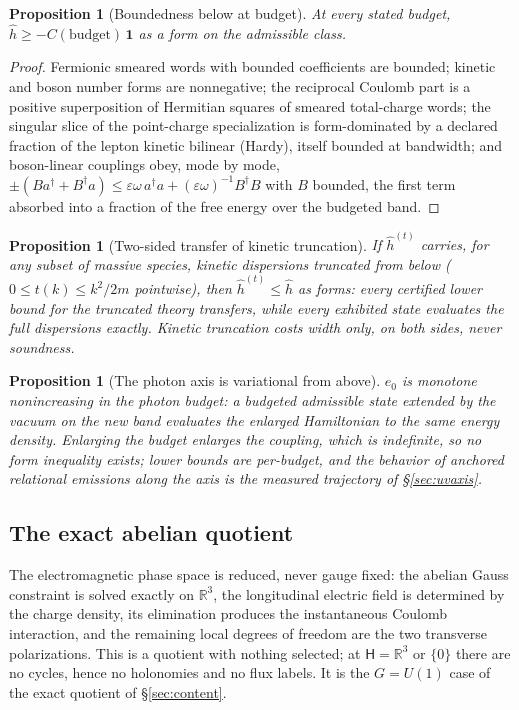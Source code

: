 \documentclass[11pt]{article}
\newtheorem{proposition}[theorem]{Proposition}
\theoremstyle{definition}
\theoremstyle{remark}
\begin{document}
\begin{proposition}[Boundedness below at budget]\label{prop:qedbounded}
At every stated budget, $\hat h \ge -C(\mathrm{budget})\,\mathbf 1$ as a
form on the admissible class.
\end{proposition}
\begin{proof}
Fermionic smeared words with bounded coefficients are bounded; kinetic
and boson number forms are nonnegative; the reciprocal Coulomb part is a
positive superposition of Hermitian squares of smeared total-charge
words; the singular slice of the point-charge specialization is
form-dominated by a declared fraction of the lepton kinetic bilinear
(Hardy), itself bounded at bandwidth; and boson-linear couplings obey,
mode by mode, $\pm(Ba^\dagger + B^\dagger a) \le \varepsilon\omega\,
a^\dagger a + (\varepsilon\omega)^{-1} B^\dagger B$ with $B$ bounded,
the first term absorbed into a fraction of the free energy over the
budgeted band.
\end{proof}

\begin{proposition}[Two-sided transfer of kinetic truncation]
\label{prop:kintrunc}
If $\hat h^{(t)}$ carries, for any subset of massive species, kinetic
dispersions truncated from below ($0 \le t(k) \le k^2/2m$ pointwise), then
$\hat h^{(t)} \le \hat h$ as forms: every certified lower bound for the
truncated theory transfers, while every exhibited state evaluates the full
dispersions exactly.  Kinetic truncation costs width only, on both sides,
never soundness.
\end{proposition}

\begin{proposition}[The photon axis is variational from above]
\label{prop:photonaxis}
$e_0$ is monotone nonincreasing in the photon budget: a budgeted admissible
state extended by the vacuum on the new band evaluates the enlarged
Hamiltonian to the same energy density.  Enlarging the budget enlarges the
coupling, which is indefinite, so no form inequality exists; lower bounds
are per-budget, and the behavior of anchored relational emissions along the
axis is the measured trajectory of \S\ref{sec:uvaxis}.
\end{proposition}

\subsection{The exact abelian quotient}
The electromagnetic phase space is reduced, never gauge fixed: the
abelian Gauss constraint is solved exactly on $\mathbb R^3$, the
longitudinal electric field is determined by the charge density, its
elimination produces the instantaneous Coulomb interaction, and the
remaining local degrees of freedom are the two transverse polarizations.
This is a quotient with nothing selected; at $\mathsf H = \mathbb R^3$ or
$\{0\}$ there are no cycles, hence no holonomies and no flux labels.  It is
the $G = U(1)$ case of the exact quotient of \S\ref{sec:content}.
\end{document}
